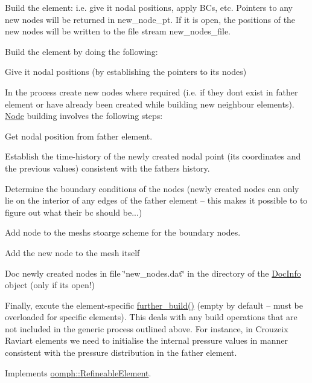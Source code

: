 Build the element\+: i.\+e. give it nodal positions, apply B\+Cs, etc. Pointers to any new nodes will be returned in new\+\_\+node\+\_\+pt. If it is open, the positions of the new nodes will be written to the file stream new\+\_\+nodes\+\_\+file. 

Build the element by doing the following\+:
\begin{DoxyItemize}
\item Give it nodal positions (by establishing the pointers to its nodes)
\item In the process create new nodes where required (i.\+e. if they don\textquotesingle{}t exist in father element or have already been created while building new neighbour elements). \hyperlink{classoomph_1_1Node}{Node} building involves the following steps\+:
\begin{DoxyItemize}
\item Get nodal position from father element.
\item Establish the time-\/history of the newly created nodal point (its coordinates and the previous values) consistent with the father\textquotesingle{}s history.
\item Determine the boundary conditions of the nodes (newly created nodes can only lie on the interior of any edges of the father element -- this makes it possible to to figure out what their bc should be...)
\item Add node to the mesh\textquotesingle{}s stoarge scheme for the boundary nodes.
\item Add the new node to the mesh itself
\item Doc newly created nodes in file \char`\"{}new\+\_\+nodes.\+dat\char`\"{} in the directory of the \hyperlink{classoomph_1_1DocInfo}{Doc\+Info} object (only if it\textquotesingle{}s open!)
\end{DoxyItemize}
\item Finally, excute the element-\/specific \hyperlink{classoomph_1_1RefineableElement_a26628ce36dfad028686adeb4694a9ef3}{further\+\_\+build()} (empty by default -- must be overloaded for specific elements). This deals with any build operations that are not included in the generic process outlined above. For instance, in Crouzeix Raviart elements we need to initialise the internal pressure values in manner consistent with the pressure distribution in the father element. 
\end{DoxyItemize}

Implements \hyperlink{classoomph_1_1RefineableElement_adc31f0903b4cbd9574017dda44cf6523}{oomph\+::\+Refineable\+Element}.



